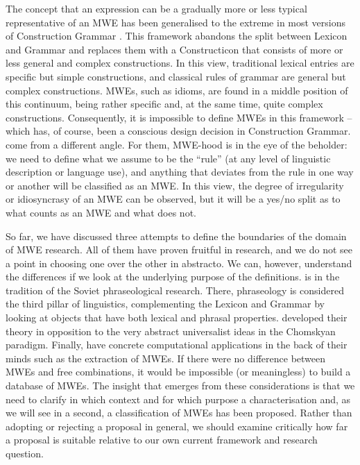 \documentclass[output=paper]{langsci/langscibook}
\begin{document}
The concept that an expression can be a gradually more or less typical representative of an MWE has been generalised to the extreme in most versions of Construction Grammar   \citep{FillmoreEtAl1988}. 
This framework abandons the split between Lexicon and Grammar and replaces them with a Constructicon that consists of more or less general and complex constructions. 
In this view, traditional lexical entries are specific but simple constructions, and classical rules of grammar are general but complex constructions. 
MWEs, such as idioms, are found in a middle position of this continuum, being rather specific and, at the same time, quite complex constructions. Consequently, it is impossible to define MWEs in this framework -- which has, of course, been a conscious design decision in Construction Grammar. \cite{Baldwin2010} come from a different angle. 
For them, MWE-hood is in the eye of the beholder: we need to define what we assume to be the “rule” (at any level of linguistic description or language use), and anything that deviates from the rule in one way or another will be classified as an MWE. 
In this view, the degree of irregularity or idiosyncrasy of an MWE can be observed, but it will be a yes/no split as to what counts as an MWE and what does not. 

So far, we have discussed three attempts to define the boundaries of the domain of MWE research. 
All of them have proven fruitful in research, and we do not see a point in choosing one over the other in abstracto. 
We can, however, understand the differences if we look at the underlying purpose of the definitions. \citet{Fleischer:97} is in the tradition of the Soviet phraseological research. 
There, phraseology is considered the third pillar of linguistics, complementing the Lexicon and Grammar by looking at objects that have both lexical and phrasal properties. 
\citet{FillmoreEtAl1988} developed their theory in opposition to the very abstract universalist ideas in the Chomskyan paradigm. 
Finally, \citet{Baldwin2010}  have concrete computational applications in the back of their minds such as the extraction of MWEs. 
If there were no difference between MWEs and free combinations, it would be impossible (or meaningless) to build a database of MWEs. 
The insight that emerges from these considerations is that we need to clarify in which context and for which purpose a characterisation and, as we will see in a second, a classification of MWEs has been proposed. Rather than adopting or rejecting a proposal in general, we should examine critically how far a proposal is suitable relative to our own current framework and research question.
\end{document}

